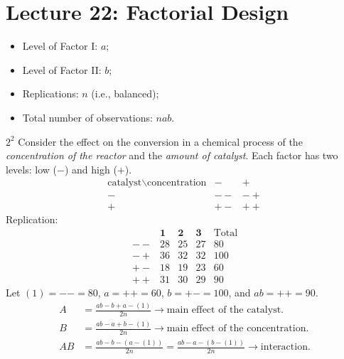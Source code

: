 \section{Lecture 22: Factorial Design}
\begin{itemize}
    \item Level of Factor I\@: $ a $;
    \item Level of Factor II\@: $ b $;
    \item Replications: $ n $ (i.e., balanced);
    \item Total number of observations: $ nab $.
\end{itemize}
\begin{Example}{$ 2^2 $}{}
    Consider the effect on the conversion in a chemical process
    of the \emph{concentration of the reactor} and the \emph{amount of
        catalyst}. Each factor has two levels:
    low ($ - $) and high ($ + $).
    \[ \begin{array}{c|cc}
            \text{catalyst}\backslash \text{concentration} & -  & +  \\
            \hline
            -                                              & -- & -+ \\
            +                                              & +- & ++
        \end{array} \]
    Replication:
    \[ \begin{array}{c|ccc|c}
               & \mathbf{1} & \mathbf{2} & \mathbf{3} & \text{Total} \\
            \hline
            -- & 28         & 25         & 27         & 80           \\
            -+ & 36         & 32         & 32         & 100          \\
            +- & 18         & 19         & 23         & 60           \\
            ++ & 31         & 30         & 29         & 90
        \end{array} \]
    Let $ (1)=--=80 $, $ a=++=60 $, $ b=+-=100 $, and $ ab=++=90 $.
    \begin{align*}
        A  & =\frac{ab-b+a-(1)}{2n}\to\text{main effect of the catalyst}.           \\
        B  & =\frac{ab-a+b-(1)}{2n}\to\text{main effect of the concentration}.      \\
        AB & =\frac{ab-b-(a-(1))}{2n}=\frac{ab-a-(b-(1))}{2n}\to\text{interaction}.
    \end{align*}

\end{Example}
